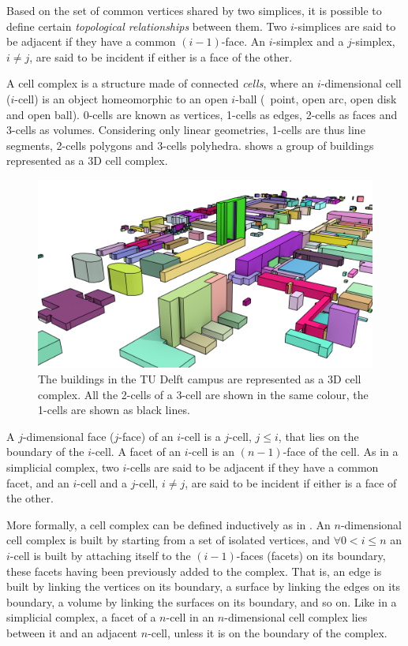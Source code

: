 Based on the set of common vertices shared by two simplices, it is possible to define certain \emph{topological relationships} between them.
Two $i$-simplices are said to be adjacent if they have a common $(i-1)$-face.
An $i$-simplex and a $j$-simplex, $i \neq j$, are said to be incident if either is a face of the other.

A cell complex is a structure made of connected \emph{cells}, where an $i$-dimensional cell ($i$-cell) is an object homeomorphic to an open $i$-ball (\ie\ point, open arc, open disk and open ball).
0-cells are known as vertices, 1-cells as edges, 2-cells as faces and 3-cells as volumes.
Considering only linear geometries, 1-cells are thus line segments, 2-cells polygons and 3-cells polyhedra.
 shows a group of buildings represented as a 3D cell complex.
\begin{figure}[tbp]
\centering
\includegraphics[width=\linewidth]{figs/cellscampus}
\caption[The TU Delft campus as a 3D cell complex]{The buildings in the TU Delft campus are represented as a 3D cell complex. All the 2-cells of a 3-cell are shown in the same colour, the 1-cells are shown as black lines.}
\label{fig:cellscampus}
\end{figure}

A $j$-dimensional face ($j$-face) of an $i$-cell is a $j$-cell, $j \leq i$, that lies on the boundary of the $i$-cell.
A facet of an $i$-cell is an $(n-1)$-face of the cell.
As in a simplicial complex, two $i$-cells are said to be adjacent if they have a common facet, and an $i$-cell and a $j$-cell, $i \neq j$, are said to be incident if either is a face of the other.

More formally, a cell complex can be defined inductively as in \citet{Hatcher02}.
An $n$-dimensional cell complex is built by starting from a set of isolated vertices, and $\forall 0 < i \leq n$ an $i$-cell is built by attaching itself to the $(i-1)$-faces (facets) on its boundary, these facets having been previously added to the complex.
That is, an edge is built by linking the vertices on its boundary, a surface by linking the edges on its boundary, a volume by linking the surfaces on its boundary, and so on.
Like in a simplicial complex, a facet of a $n$-cell in an $n$-dimensional cell complex lies between it and an adjacent $n$-cell, unless it is on the boundary of the complex.

